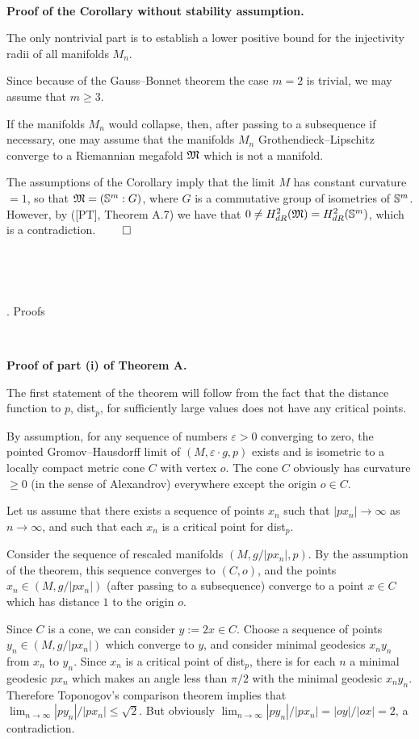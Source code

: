 \

\noindent
{\bf Proof of the Corollary without stability assumption.}
 
The only nontrivial part is to establish a lower positive bound
for the injectivity radii of all manifolds $M_n$.

Since because of the Gauss--Bonnet theorem
the case $m=2$ is trivial, we may assume that $m\ge 3$.

If the manifolds $M_n$ would collapse, then, after passing to
a subsequence if necessary, one may assume
that
the manifolds $M_n$ Grothendieck--Lipschitz converge to a Riemannian megafold
${\frak M}$ which is not a manifold.

The assumptions of the Corollary imply that
the limit ${M}$ has constant curvature $=1$,
so that ${\frak M}=({\Bbb S}^m:G)$, where $G$ is a commutative group of isometries
of ${\Bbb S}^m$.
However, by ([PT], Theorem A.7)
we have that $0\not=H^2_{dR}({\frak M})=H^2_{dR}({\Bbb S}^m)$, 
which is a contradiction.
$\qed$



\

\

. Proofs
\endhead

\ 
 
\noindent 
{\bf Proof of part (i) of Theorem A.}

The first statement of the theorem will follow from the fact  
that the distance function to $p$, dist$_p$,  
for sufficiently large values does not have any critical points.
 
By assumption, for any sequence of numbers $\varepsilon>0$ converging to zero, 
the pointed Gromov--Hausdorff limit of $(M,\varepsilon{\cdot} g,p)$ exists  
and is isometric to a locally compact metric cone $C$ with vertex $o$. 
The cone $C$ obviously has curvature $\ge 0$ (in the sense of Alexandrov)
everywhere except the origin $o\in C$. 
 

Let us assume that there exists a sequence of points $x_n$  
such that $|px_n|\to\infty$ as $n\to\infty$, 
and such that each $x_n$ is a critical point for dist$_p$.  
 
Consider the sequence of rescaled manifolds $(M,g/|px_n|,p)$. 
By the assumption of the theorem, this sequence converges to $(C,o)$, 
and the points $x_n\in (M, g/|px_n|)$ (after passing to a subsequence)
converge to a point $x\in C$  
which has distance $1$ to the origin $o$. 
 
Since $C$ is a cone, we can consider $y:=2x\in C$. 
Choose a sequence of points $y_n\in (M,g/|px_n|)$ which converge to $y$,  
and consider minimal geodesics $x_ny_n$ from $x_n$ to $y_n$. 
Since $x_n$ is a critical point of dist$_p$, 
there is for each $n$ a minimal geodesic $px_n$ which makes an angle less than 
$\pi/2$ with the minimal geodesic $x_ny_n$. 
Therefore Toponogov's comparison theorem implies that 
$\lim_{n\to\infty}|py_n|/|px_n|\le \sqrt 2$. 
But obviously $\lim_{n\to\infty}|py_n|/|px_n|= |oy|/|ox|=2$, a contradiction. 

